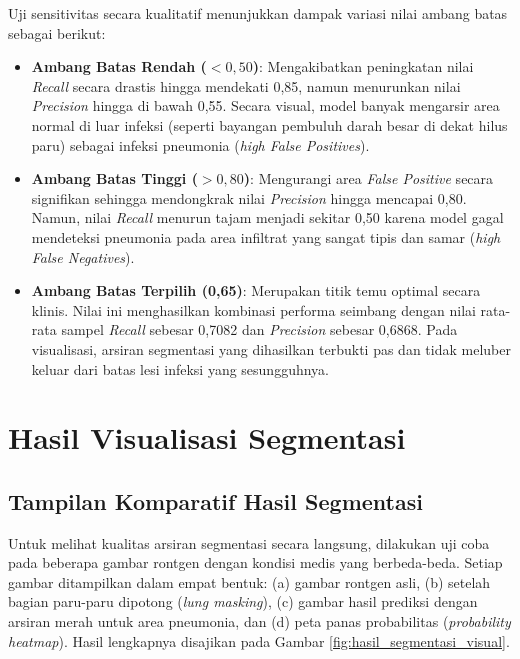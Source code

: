 \documentclass[12pt,a4paper,oneside]{book}
\begin{document}
Uji sensitivitas secara kualitatif menunjukkan dampak variasi nilai ambang batas sebagai berikut:
\begin{itemize}
  \item \textbf{Ambang Batas Rendah ($< 0,50$)}: Mengakibatkan peningkatan nilai \textit{Recall} secara drastis hingga mendekati 0,85, namun menurunkan nilai \textit{Precision} hingga di bawah 0,55. Secara visual, model banyak mengarsir area normal di luar infeksi (seperti bayangan pembuluh darah besar di dekat hilus paru) sebagai infeksi pneumonia (\textit{high False Positives}).
  \item \textbf{Ambang Batas Tinggi ($> 0,80$)}: Mengurangi area \textit{False Positive} secara signifikan sehingga mendongkrak nilai \textit{Precision} hingga mencapai 0,80. Namun, nilai \textit{Recall} menurun tajam menjadi sekitar 0,50 karena model gagal mendeteksi pneumonia pada area infiltrat yang sangat tipis dan samar (\textit{high False Negatives}).
  \item \textbf{Ambang Batas Terpilih (0,65)}: Merupakan titik temu optimal secara klinis. Nilai ini menghasilkan kombinasi performa seimbang dengan nilai rata-rata sampel \textit{Recall} sebesar 0,7082 dan \textit{Precision} sebesar 0,6868. Pada visualisasi, arsiran segmentasi yang dihasilkan terbukti pas dan tidak meluber keluar dari batas lesi infeksi yang sesungguhnya.
\end{itemize}

\section{Hasil Visualisasi Segmentasi}

\subsection{Tampilan Komparatif Hasil Segmentasi}

Untuk melihat kualitas arsiran segmentasi secara langsung, dilakukan uji coba pada beberapa gambar rontgen dengan kondisi medis yang berbeda-beda. Setiap gambar ditampilkan dalam empat bentuk: (a) gambar rontgen asli, (b) setelah bagian paru-paru dipotong (\textit{lung masking}), (c) gambar hasil prediksi dengan arsiran merah untuk area pneumonia, dan (d) peta panas probabilitas (\textit{probability heatmap}). Hasil lengkapnya disajikan pada Gambar \ref{fig:hasil_segmentasi_visual}.
\end{document}
